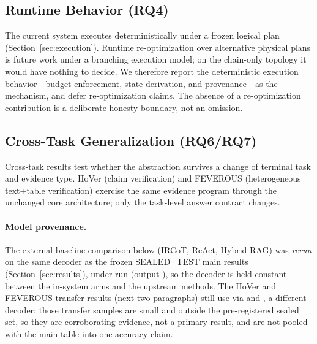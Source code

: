 \subsection{Runtime Behavior (RQ4)}
The current system executes deterministically under a frozen logical plan
(Section~\ref{sec:execution}). Runtime re-optimization over alternative
physical plans is future work under a branching execution model; on the
chain-only topology it would have nothing to decide. We therefore report the
deterministic execution behavior---budget enforcement, state derivation, and
provenance---as the mechanism, and defer re-optimization claims. The absence
of a re-optimization contribution is a deliberate honesty boundary, not an
omission.

\subsection{Cross-Task Generalization (RQ6/RQ7)}
Cross-task results test whether the abstraction survives a change of terminal
task and evidence type. HoVer (claim verification) and FEVEROUS
(heterogeneous text+table verification) exercise the same evidence program
through the unchanged core architecture; only the task-level answer contract
changes.
\paragraph{Model provenance.}
The external-baseline comparison below (IRCoT, ReAct, Hybrid RAG) was
\emph{rerun} on the same  decoder as the frozen SEALED\_TEST
main results (Section~\ref{sec:results}), under run
 (output ), so the
decoder is held constant between the in-system arms and the upstream methods.
The HoVer and FEVEROUS transfer results (next two paragraphs) still use
 via  and
, a different decoder; those transfer
samples are small and outside the pre-registered sealed set, so they are
corroborating evidence, not a primary result, and are not pooled with the
 main table into one accuracy claim.


